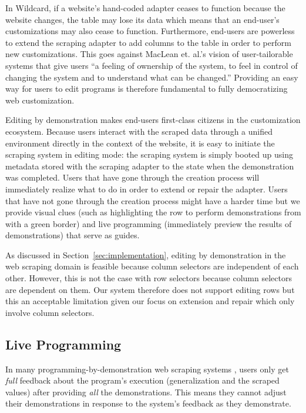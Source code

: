 \documentclass[sigconf,10pt]{acmart}
\begin{document}
In Wildcard, if a website's hand-coded adapter ceases to function
because the website changes, the table may lose its data which means
that an end-user's customizations may also cease to function.
Furthermore, end-users are powerless to extend the scraping adapter to
add columns to the table in order to perform new customizations. This
goes against MacLean et. al.'s vision of user-tailorable systems
\citep{maclean1990} that give users ``a feeling of ownership of the
system, to feel in control of changing the system and to understand what
can be changed.'' Providing an easy way for users to edit programs is
therefore fundamental to fully democratizing web customization.

Editing by demonstration makes end-users first-class citizens in the
customization ecosystem. Because users interact with the scraped data
through a unified environment directly in the context of the website, it
is easy to initiate the scraping system in editing mode: the scraping
system is simply booted up using metadata stored with the scraping
adapter to the state when the demonstration was completed. Users that
have gone through the creation process will immediately realize what to
do in order to extend or repair the adapter. Users that have not gone
through the creation process might have a harder time but we provide
visual clues (such as highlighting the row to perform demonstrations
from with a green border) and live programming (immediately preview the
results of demonstrations) that serve as guides.

As discussed in Section~\ref{sec:implementation}, editing by
demonstration in the web scraping domain is feasible because column
selectors are independent of each other. However, this is not the case
with row selectors because column selectors are dependent on them. Our
system therefore does not support editing rows but this an acceptable
limitation given our focus on extension and repair which only involve
column selectors.

\hypertarget{live-programming-1}{%
\subsection{Live Programming}\label{live-programming-1}}

In many programming-by-demonstration web scraping systems
\citep[\citet{lin2009}]{chasins2018}, users only get \emph{full}
feedback about the program's execution (generalization and the scraped
values) after providing \emph{all} the demonstrations. This means they
cannot adjust their demonstrations in response to the system's feedback
as they demonstrate.
\end{document}
